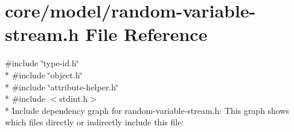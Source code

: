\hypertarget{random-variable-stream_8h}{}\section{core/model/random-\/variable-\/stream.h File Reference}
\label{random-variable-stream_8h}
{\ttfamily \#include \char`\"{}type-\/id.\+h\char`\"{}}\\*
{\ttfamily \#include \char`\"{}object.\+h\char`\"{}}\\*
{\ttfamily \#include \char`\"{}attribute-\/helper.\+h\char`\"{}}\\*
{\ttfamily \#include $<$stdint.\+h$>$}\\*
Include dependency graph for random-\/variable-\/stream.h\+:
This graph shows which files directly or indirectly include this file\+:

